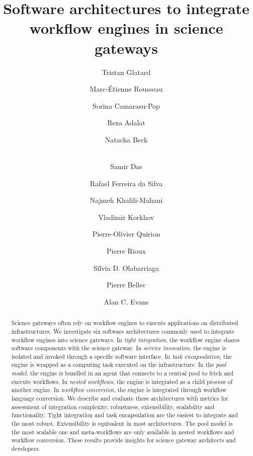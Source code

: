 \documentclass[preprint,3p,twocolumn]{elsarticle}
\newcommand{\correction}[1]{\color{blue}#1\color{black}\xspace}
\begin{document}
\begin{frontmatter}

\title{Software architectures to integrate workflow engines in science gateways} 

\author[concordia,mcgill,creatis]{Tristan Glatard}
\author[mcgill]{Marc-\'Etienne Rousseau}
\author[creatis]{Sorina Camarasu-Pop}

\author[mcgill]{Reza Adalat}
\author[mcgill]{Natacha Beck}
\author[mcgill]{\\Samir Das}
\author[isi]{Rafael Ferreira da Silva}
\author[mcgill]{Najmeh Khalili-Mahani}
\author[stpetersburg]{Vladimir Korkhov}
\author[criugm]{Pierre-Olivier Quirion}
\author[mcgill]{Pierre Rioux}
\author[amc]{S\'ilvia D. Olabarriaga}
\author[criugm]{Pierre Bellec}
\author[mcgill]{Alan C. Evans}

\address[concordia]{Department of Computer Science and Software Engineering, Concordia University, Montreal, Canada.}
\address[mcgill]{McGill Centre for Integrative Neuroscience, Montreal Neurological Institute, McGill University, Canada.}
\address[creatis]{University of Lyon, CNRS, INSERM, CREATIS, Villeurbanne, France.}
\address[criugm]{Centre de Recherche de l'Institut de G\'eriatrie de Montr\'eal CRIUGM, Montr\'eal, QC, Canada.}
\address[isi]{University of Southern California, Information Sciences Institute, Marina del Rey, CA, USA.}
\address[amc]{Dept. Clinical Epidemiology, Biostatistics and Bioinformatics, Academic Medical Center, University of Amsterdam, NL.}
\address[stpetersburg]{St. Petersburg State University, Russia.}

\begin{abstract}
  Science gateways often rely on workflow engines to execute
  applications on distributed infrastructures. We investigate six
  software architectures commonly used to integrate workflow engines
  into science gateways. In \emph{tight integration}, the workflow
  engine shares software components with the science gateway. In
  \emph{service invocation}, the engine is isolated and invoked
  through a specific software interface. In \emph{task encapsulation},
  the engine is wrapped as a computing task executed on the
  infrastructure. In the \emph{pool model}, the engine is bundled in
  an agent that connects to a central pool to fetch and execute
  workflows. In \emph{nested workflows}, the engine is integrated as a
  child process of another engine. In \emph{workflow conversion}, the
  engine is integrated through workflow language conversion. We
  describe and evaluate these architectures with metrics for
  assessment of integration complexity, robustness, extensibility,
  scalability and \correction{functionality}. Tight integration and
  task encapsulation are the easiest to integrate and the most
  robust. Extensibility is equivalent in most architectures. The pool
  model is the most scalable one and meta-workflows are only available
  in nested workflows and workflow conversion. These results provide
  insights for science gateway architects and developers.
\end{abstract}


\end{frontmatter}
\end{document}
